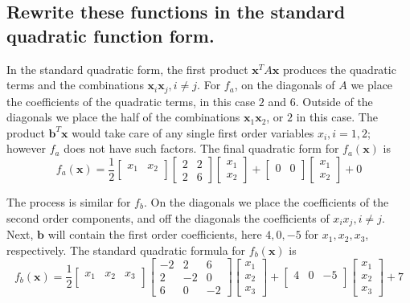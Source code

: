 \documentclass[11pt]{scrartcl}
\newcommand{\vect}{\boldsymbol}
\begin{document}
\subsection{Rewrite these functions in the standard quadratic function form.}
In the standard quadratic form, the first product $\vect{x}^{T}A\vect{x}$ produces the quadratic terms and
the combinations $\vect{x}_i\vect{x}_j, i\neq j$.
For $f_a$,
on the diagonals of $A$ we place the coefficients of the quadratic terms, in this case $2$ and $6$.
Outside of the diagonals we place the half of the combinations $\vect{x}_1\vect{x}_2$, or $2$ in this case.
The product $\vect{b}^{T}\vect{x}$ would take care of any single first order variables $x_{i}, i=1,2$; however
$f_a$ does not have such factors.
The final quadratic form for $f_a(\vect{x})$ is 
\begin{equation}
	f_a(\vect{x}) = 
	\frac{1}{2}
	\begin{bmatrix}
		x_1 & x_2\\
	\end{bmatrix}
	\begin{bmatrix}
			2 & 2 \\
			2 & 6 
	\end{bmatrix}
	\begin{bmatrix}
			x_1 \\
			x_2
	\end{bmatrix}
	+
	\begin{bmatrix}
		0 & 0\\
	\end{bmatrix}
	\begin{bmatrix}
		x_1\\
		x_2
	\end{bmatrix}
	+ 0
\end{equation}

The process is similar for $f_b$.
On the diagonals we place the coefficients of the second order components, and off the diagonals the 
coefficients of $x_i x_j, i\neq j$.
Next, $\vect{b}$ will contain the first order coefficients, here $4, 0, -5$ for $x_1, x_2, x_3$, respectively.
The standard quadratic formula for $f_b(\vect{x})$ is
\begin{equation}
	f_b(\vect{x}) = 
	\frac{1}{2}
	\begin{bmatrix}
			x_1 & x_2 & x_3\\
	\end{bmatrix}
	\begin{bmatrix}
			-2 & 2 & 6\\
			2 & -2 & 0\\
			6 & 0 & -2
	\end{bmatrix}
	\begin{bmatrix}
		x_1\\
		x_2\\
		x_3
	\end{bmatrix}
	+
	\begin{bmatrix}
		4 & 0 & -5\\
	\end{bmatrix}
	\begin{bmatrix}
			x_1\\
			x_2\\
			x_3
	\end{bmatrix}
	+ 7
\end{equation}
\end{document}
